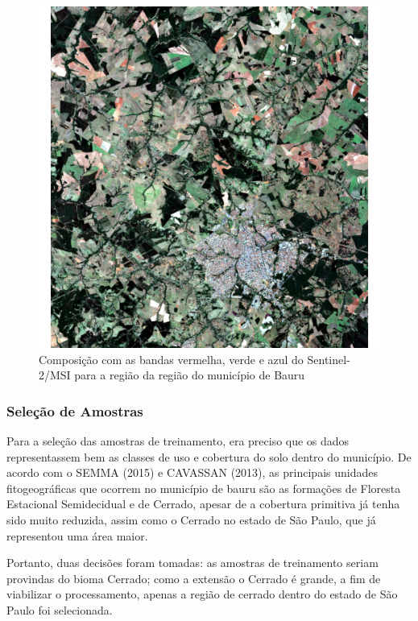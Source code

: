 \begin{figure}[H]
    \centering
    \caption{Composição com as bandas vermelha, verde e azul do Sentinel-2/MSI para a região da região do município de Bauru} \label{fig-rgb}
    \includegraphics[scale=0.55]{figs/plot_sentinel-rgb.pdf}
\end{figure}

\subsubsection{Seleção de Amostras}\label{selecao-de-amostras}

    Para a seleção das amostras de treinamento, era preciso que os dados
representassem bem as classes de uso e cobertura do solo dentro do
município. De acordo com o SEMMA (2015) e CAVASSAN (2013), as principais unidades fitogeográficas que ocorrem no município de bauru são as formações de Floresta Estacional Semidecidual e de Cerrado, apesar de a cobertura primitiva já tenha sido muito reduzida, assim como o Cerrado no estado de São Paulo, que já representou uma área maior.

    Portanto, duas decisões foram tomadas: as amostras de treinamento
seriam provindas do bioma Cerrado; como a extensão o Cerrado é grande, a
fim de viabilizar o processamento, apenas a região de cerrado dentro do
estado de São Paulo foi selecionada.

